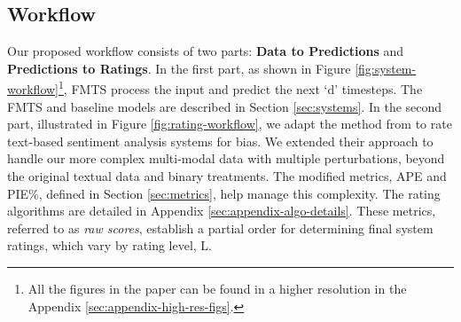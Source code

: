 \subsection{Workflow}
\label{sec:workflow}
Our proposed workflow consists of two parts: \textbf{Data to Predictions} and \textbf{Predictions to Ratings}. In the first part, as shown in Figure \ref{fig:system-workflow}\footnote{All the figures in the paper can be found in a higher resolution in the Appendix \ref{sec:appendix-high-res-figs}.}, FMTS process the input and predict the next `d' timesteps. The FMTS and baseline models are described in Section \ref{sec:systems}. In the second part, illustrated in Figure \ref{fig:rating-workflow}, we adapt the method from \cite{kausik2024rating} to rate text-based sentiment analysis systems for bias. We extended their approach to handle our more complex multi-modal data with multiple perturbations, beyond the original textual data and binary treatments. The modified metrics, APE and PIE\%, defined in Section \ref{sec:metrics}, help manage this complexity. The rating algorithms are detailed in Appendix \ref{sec:appendix-algo-details}. These metrics, referred to as \textit{raw scores}, establish a partial order for determining final system ratings, which vary by rating level, L.


